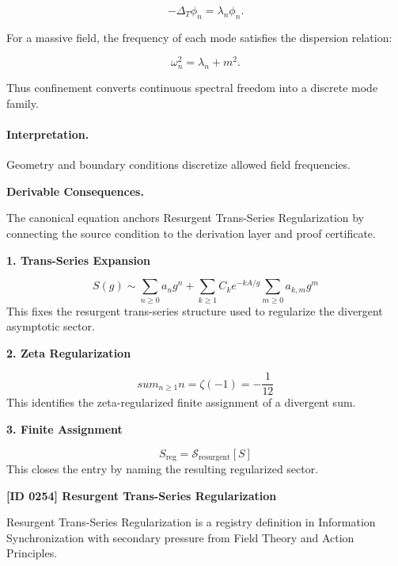 \begin{equation}
-\Delta_T \phi_n = \lambda_n\phi_n .
\end{equation}

For a massive field, the frequency of each mode satisfies the dispersion relation:

\begin{equation}
\omega_n^2=\lambda_n+m^2 .
\end{equation}

Thus confinement converts continuous spectral freedom into a discrete mode family.

\paragraph{Interpretation.}
Geometry and boundary conditions discretize allowed field frequencies.

\par\vspace{0.35em}
\noindent\textbf{Derivable Consequences.}\quad
\begingroup
\footnotesize
\raggedright
The canonical equation anchors Resurgent Trans-Series Regularization by connecting the source condition to the derivation layer and proof certificate.
\par\endgroup

\noindent\textbf{1. Trans-Series Expansion}\par
\[
S(g)\sim \sum_{n\geq 0} a_n g^n + \sum_{k\geq 1} C_k e^{-kA/g}\sum_{m\geq 0} a_{k,m} g^m
\]
\noindent This fixes the resurgent trans-series structure used to regularize the divergent asymptotic sector.\par
\noindent\textbf{2. Zeta Regularization}\par
\[
sum_{n\geq 1} n = \zeta(-1) = -\frac{1}{12}
\]
\noindent This identifies the zeta-regularized finite assignment of a divergent sum.\par
\noindent\textbf{3. Finite Assignment}\par
\[
S_{\mathrm{reg}} = \mathcal{S}_{\mathrm{resurgent}}[S]
\]
\noindent This closes the entry by naming the resulting regularized sector.\par

\clearpage
\noindent\textbf{[ID 0254] Resurgent Trans-Series Regularization}\par
\vspace{0.35em}
\begingroup\small
{}
Resurgent Trans-Series Regularization is a registry definition in Information Synchronization with secondary pressure from Field Theory and Action Principles.

